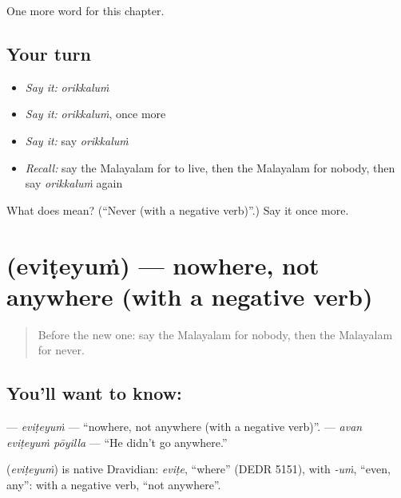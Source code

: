 \begin{grammarlens}[title={What you've built}]
One more word for this chapter.
\end{grammarlens}

\subsection*{Your turn}
\begin{itemize}
\raggedright
  \item \emph{Say it:} \emph{orikkaluṁ}
  \item \emph{Say it:} \emph{orikkaluṁ}, once more
  \item \emph{Say it:} say \emph{orikkaluṁ}
  \item \emph{Recall:} say the Malayalam for to live, then the Malayalam for nobody, then say \emph{orikkaluṁ} again
\end{itemize}

\begin{tcolorbox}[breakable,colback=teal!4,colframe=teal!35!black,title={Before you move on}]
What does  mean? (\textquotedblleft{}Never (with a negative verb)\textquotedblright{}.) Say it once more.
\end{tcolorbox}
\section[\texorpdfstring{\ml{എവിടെയും} (eviṭeyuṁ)}{എവിടെയും (eviṭeyuṁ)}]{ (eviṭeyuṁ) — nowhere, not anywhere (with a negative verb)}

\label{lesson:ML-C177-eviteyum}



\begin{quote}
Before the new one: say the Malayalam for nobody, then the Malayalam for never.
\end{quote}

\subsection*{You'll want to know: }
\textbf{} — \emph{eviṭeyuṁ} — \textquotedblleft{}nowhere, not anywhere (with a negative verb)\textquotedblright{}. \textbf{  } — \emph{avan eviṭeyuṁ pōyilla} — \textquotedblleft{}He didn't go anywhere.\textquotedblright{}

\begin{cousinweb}
\textbf{} (\emph{eviṭeyuṁ}) is native Dravidian: \emph{eviṭe}, \textquotedblleft{}where\textquotedblright{} (DEDR 5151), with \emph{-uṁ}, \textquotedblleft{}even, any\textquotedblright{}: with a negative verb, \textquotedblleft{}not anywhere\textquotedblright{}.
\end{cousinweb}

